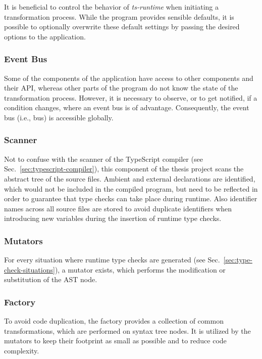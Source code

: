 It is beneficial to control the behavior of \emph{ts-runtime} when initiating a transformation process. While the program provides sensible defaults, it is possible to optionally overwrite these default settings by passing the desired options to the application.

\subsubsection{Event Bus}

Some of the components of the application have access to other components and their API, whereas other parts of the program do not know the state of the transformation process. However, it is necessary to observe, or to get notified, if a condition changes, where an event bus is of advantage. Consequently, the event bus (i.e., bus) is accessible globally. 

\subsubsection{Scanner}

Not to confuse with the scanner of the TypeScript compiler (see Sec.~\ref{sec:typescript-compiler}), this component of the thesis project scans the abstract tree of the source files. Ambient and external declarations are identified, which would not be included in the compiled program, but need to be reflected in order to guarantee that type checks can take place during runtime. Also identifier names across all source files are stored to avoid duplicate identifiers when introducing new variables during the insertion of runtime type checks.

\subsubsection{Mutators}

For every situation where runtime type checks are generated (see Sec.~\ref{sec:type-check-situations}), a mutator exists, which performs the modification or substitution of the AST node.

\subsubsection{Factory}

To avoid code duplication, the factory provides a collection of common transformations, which are performed on syntax tree nodes. It is utilized by the mutators to keep their footprint as small as possible and to reduce code complexity.

